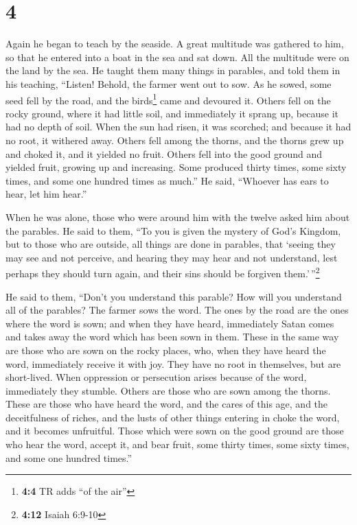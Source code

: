\hypertarget{section-3}{%
\section{4}\label{section-3}}

 Again he began to teach by the seaside. A great multitude
was gathered to him, so that he entered into a boat in the sea and sat
down. All the multitude were on the land by the sea.  He
taught them many things in parables, and told them in his teaching,
 ``Listen! Behold, the farmer went out to sow.
 As he sowed, some seed fell by the road, and the
birds\footnote{\textbf{4:4} TR adds ``of the air''} came and devoured
it.  Others fell on the rocky ground, where it had little
soil, and immediately it sprang up, because it had no depth of soil.
 When the sun had risen, it was scorched; and because it
had no root, it withered away.  Others fell among the
thorns, and the thorns grew up and choked it, and it yielded no fruit.
 Others fell into the good ground and yielded fruit,
growing up and increasing. Some produced thirty times, some sixty times,
and some one hundred times as much.''  He said, ``Whoever
has ears to hear, let him hear.''

 When he was alone, those who were around him with the
twelve asked him about the parables.  He said to them,
``To you is given the mystery of God's Kingdom, but to those who are
outside, all things are done in parables,  that `seeing
they may see and not perceive, and hearing they may hear and not
understand, lest perhaps they should turn again, and their sins should
be forgiven them.'\,''\footnote{\textbf{4:12} Isaiah 6:9-10}

 He said to them, ``Don't you understand this parable?
How will you understand all of the parables?  The farmer
sows the word.  The ones by the road are the ones where
the word is sown; and when they have heard, immediately Satan comes and
takes away the word which has been sown in them.  These
in the same way are those who are sown on the rocky places, who, when
they have heard the word, immediately receive it with joy.
 They have no root in themselves, but are short-lived.
When oppression or persecution arises because of the word, immediately
they stumble.  Others are those who are sown among the
thorns. These are those who have heard the word,  and the
cares of this age, and the deceitfulness of riches, and the lusts of
other things entering in choke the word, and it becomes unfruitful.
 Those which were sown on the good ground are those who
hear the word, accept it, and bear fruit, some thirty times, some sixty
times, and some one hundred times.''

